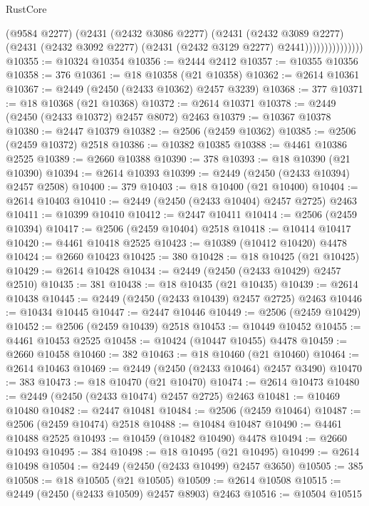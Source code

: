 \begin{lexlean}{RustCore}
\begin{coremodule}
                          (@9584 @2277)
                          (@2431
                            (@2432 @3086 @2277)
                            (@2431
                              (@2432 @3089 @2277)
                              (@2431
                                (@2432 @3092 @2277)
                                (@2431 (@2432 @3129 @2277) @2441)))))))))))))))
@10355 := @10324 @10354
@10356 := @2444 @2412
@10357 := @10355 @10356
@10358 := 376
@10361 := @18 @10358 (@21 @10358)
@10362 := @2614 @10361
@10367 := @2449 (@2450 (@2433 @10362) @2457 @3239)
@10368 := 377
@10371 := @18 @10368 (@21 @10368)
@10372 := @2614 @10371
@10378 := @2449 (@2450 (@2433 @10372) @2457 @8072) @2463
@10379 := @10367 @10378
@10380 := @2447 @10379
@10382 := @2506 (@2459 @10362)
@10385 := @2506 (@2459 @10372) @2518
@10386 := @10382 @10385
@10388 := @4461 @10386 @2525
@10389 := @2660 @10388
@10390 := 378
@10393 := @18 @10390 (@21 @10390)
@10394 := @2614 @10393
@10399 := @2449 (@2450 (@2433 @10394) @2457 @2508)
@10400 := 379
@10403 := @18 @10400 (@21 @10400)
@10404 := @2614 @10403
@10410 := @2449 (@2450 (@2433 @10404) @2457 @2725) @2463
@10411 := @10399 @10410
@10412 := @2447 @10411
@10414 := @2506 (@2459 @10394)
@10417 := @2506 (@2459 @10404) @2518
@10418 := @10414 @10417
@10420 := @4461 @10418 @2525
@10423 := @10389 (@10412 @10420) @4478
@10424 := @2660 @10423
@10425 := 380
@10428 := @18 @10425 (@21 @10425)
@10429 := @2614 @10428
@10434 := @2449 (@2450 (@2433 @10429) @2457 @2510)
@10435 := 381
@10438 := @18 @10435 (@21 @10435)
@10439 := @2614 @10438
@10445 := @2449 (@2450 (@2433 @10439) @2457 @2725) @2463
@10446 := @10434 @10445
@10447 := @2447 @10446
@10449 := @2506 (@2459 @10429)
@10452 := @2506 (@2459 @10439) @2518
@10453 := @10449 @10452
@10455 := @4461 @10453 @2525
@10458 := @10424 (@10447 @10455) @4478
@10459 := @2660 @10458
@10460 := 382
@10463 := @18 @10460 (@21 @10460)
@10464 := @2614 @10463
@10469 := @2449 (@2450 (@2433 @10464) @2457 @3490)
@10470 := 383
@10473 := @18 @10470 (@21 @10470)
@10474 := @2614 @10473
@10480 := @2449 (@2450 (@2433 @10474) @2457 @2725) @2463
@10481 := @10469 @10480
@10482 := @2447 @10481
@10484 := @2506 (@2459 @10464)
@10487 := @2506 (@2459 @10474) @2518
@10488 := @10484 @10487
@10490 := @4461 @10488 @2525
@10493 := @10459 (@10482 @10490) @4478
@10494 := @2660 @10493
@10495 := 384
@10498 := @18 @10495 (@21 @10495)
@10499 := @2614 @10498
@10504 := @2449 (@2450 (@2433 @10499) @2457 @3650)
@10505 := 385
@10508 := @18 @10505 (@21 @10505)
@10509 := @2614 @10508
@10515 := @2449 (@2450 (@2433 @10509) @2457 @8903) @2463
@10516 := @10504 @10515

\end{coremodule}
\end{lexlean}
